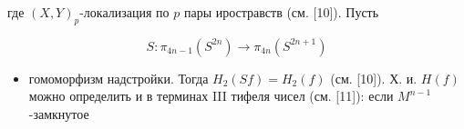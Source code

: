 \documentclass[10pt]{article}
\begin{document}
где $(X, Y)_{p}$-локализация по $p$ пары иростравств (см. [10]). Пусть



\[

S: \pi_{4 n-1}\left(S^{2 n}\right) \rightarrow \pi_{4 n}\left(S^{2 n+1}\right)

\]



\begin{itemize}

  \item гомоморфизм надстройки. Тогда $H_{2}(S f)=H_{2}(f)$ (см. [10]). Х. и. $H(f)$ можно определить и в терминах III тифеля чисел (см. [11]): если $M^{n-1}$-замкнутое

\end{itemize}
\end{document}
